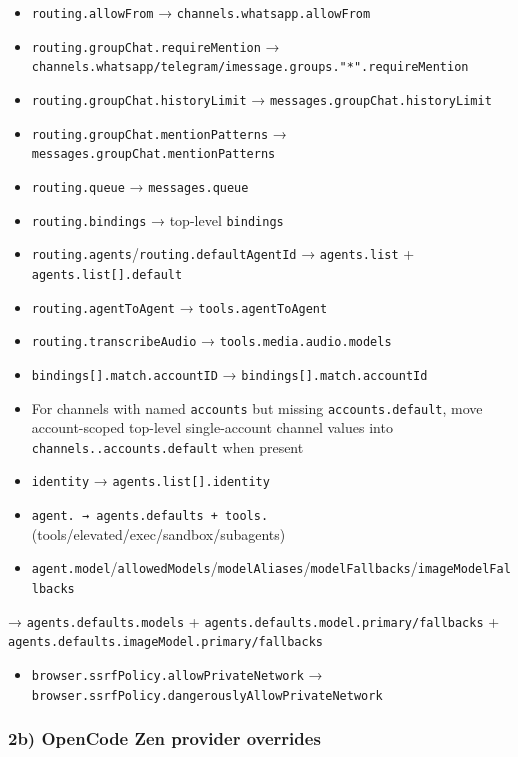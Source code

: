 \begin{itemize}
  \item \texttt{routing.allowFrom} → \texttt{channels.whatsapp.allowFrom}
  \item \texttt{routing.groupChat.requireMention} → \texttt{channels.whatsapp/telegram/imessage.groups."*".requireMention}
  \item \texttt{routing.groupChat.historyLimit} → \texttt{messages.groupChat.historyLimit}
  \item \texttt{routing.groupChat.mentionPatterns} → \texttt{messages.groupChat.mentionPatterns}
  \item \texttt{routing.queue} → \texttt{messages.queue}
  \item \texttt{routing.bindings} → top-level \texttt{bindings}
  \item \texttt{routing.agents}/\texttt{routing.defaultAgentId} → \texttt{agents.list} + \texttt{agents.list[].default}
  \item \texttt{routing.agentToAgent} → \texttt{tools.agentToAgent}
  \item \texttt{routing.transcribeAudio} → \texttt{tools.media.audio.models}
  \item \texttt{bindings[].match.accountID} → \texttt{bindings[].match.accountId}
  \item For channels with named \texttt{accounts} but missing \texttt{accounts.default}, move account-scoped top-level single-account channel values into \texttt{channels..accounts.default} when present
  \item \texttt{identity} → \texttt{agents.list[].identity}
  \item \texttt{agent.\textit{} → \texttt{agents.defaults} + \texttt{tools.}} (tools/elevated/exec/sandbox/subagents)
  \item \texttt{agent.model}/\texttt{allowedModels}/\texttt{modelAliases}/\texttt{modelFallbacks}/\texttt{imageModelFallbacks}
\end{itemize}

→ \texttt{agents.defaults.models} + \texttt{agents.defaults.model.primary/fallbacks} + \texttt{agents.defaults.imageModel.primary/fallbacks}
\begin{itemize}
  \item \texttt{browser.ssrfPolicy.allowPrivateNetwork} → \texttt{browser.ssrfPolicy.dangerouslyAllowPrivateNetwork}
\end{itemize}


\subsubsection{2b) OpenCode Zen provider overrides}


